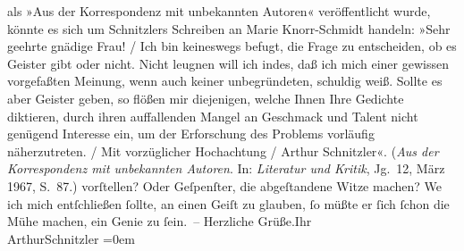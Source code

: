 \begin{ledgroupsized}[t]{13cm}
{{{                  als »Aus der Korrespondenz mit unbekannten Autoren« veröffentlicht wurde, könnte
                  es sich um Schnitzlers Schreiben an Marie Knorr-Schmidt handeln: »Sehr
                        geehrte gnädige Frau!{ / }Ich bin keineswegs befugt, die Frage zu entscheiden, ob es Geister gibt oder
                        nicht. Nicht leugnen will ich indes, daß ich mich einer gewissen vorgefaßten
                        Meinung, wenn auch keiner unbegründeten, schuldig weiß. Sollte es aber
                        Geister geben, so flößen mir diejenigen, welche Ihnen Ihre Gedichte
                        diktieren, durch ihren auffallenden Mangel an Geschmack und Talent nicht
                        genügend Interesse ein, um der Erforschung des Problems vorläufig
                        näherzutreten.{ / }Mit vorzüglicher Hochachtung{ / }Arthur Schnitzler«. (\emph{Aus der
                        Korrespondenz mit unbekannten Autoren}. In: \emph{Literatur und Kritik}, Jg. 12, März 1967,
                     S. 87.)}}}\label{K_L01363-1h} vorſtellen? Oder Geſpenſter, die abgeſtandene Witze
               machen? We{\geminationn} ich mich entſchließen ſollte, an einen Geiſt
               zu glauben, ſo müßte er ſich ſchon die Mühe machen, ein Genie zu ſein. –\pend
           \pstart
           Herzliche Grüße.\hspace*{1.5em}Ihr{\\[\baselineskip]}\spacefill\mbox{ArthurSchnitzler}\pend
           \leftskip=0em{}\endnumbering{}\end{ledgroupsized}  \newcommand{\dateiname}{L01363}\newcommand{\titel}{Arthur Schnitzler an Michael Georg Conrad, 24. 1. 1904}\newcommand{\editorInnen}{Martin Anton Müller und Gerd-Hermann Susen}
      
